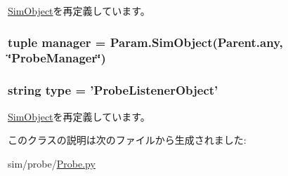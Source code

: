 \hyperlink{classm5_1_1SimObject_1_1SimObject_a17da7064bc5c518791f0c891eff05fda}{SimObject}を再定義しています。\hypertarget{classProbe_1_1ProbeListenerObject_af0880e1c5eebd0a677fcda1f43d4859b}{
\subsubsection[{manager}]{\setlength{\rightskip}{0pt plus 5cm}tuple {\bf manager} = Param.SimObject(Parent.any, \char`\"{}ProbeManager\char`\"{})}}
\label{classProbe_1_1ProbeListenerObject_af0880e1c5eebd0a677fcda1f43d4859b}
\hypertarget{classProbe_1_1ProbeListenerObject_acce15679d830831b0bbe8ebc2a60b2ca}{
\subsubsection[{type}]{\setlength{\rightskip}{0pt plus 5cm}string {\bf type} = '{\bf ProbeListenerObject}'}}
\label{classProbe_1_1ProbeListenerObject_acce15679d830831b0bbe8ebc2a60b2ca}


\hyperlink{classm5_1_1SimObject_1_1SimObject_acce15679d830831b0bbe8ebc2a60b2ca}{SimObject}を再定義しています。

このクラスの説明は次のファイルから生成されました:\begin{DoxyCompactItemize}
\item 
sim/probe/\hyperlink{Probe_8py}{Probe.py}\end{DoxyCompactItemize}

